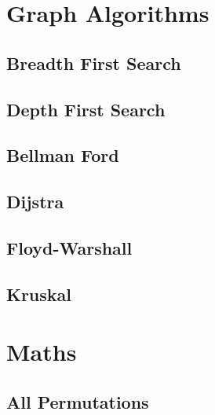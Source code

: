 \documentclass[10pt,a4paper]{article}
\begin{document}
\begin{landscape}
\begin{multicols*}{2}


\section{Graph Algorithms}

\subsection{Breadth First Search}



\subsection{Depth First Search}



\subsection{Bellman Ford}



\subsection{Dijstra}



\subsection{Floyd-Warshall}



\subsection{Kruskal}



\section{Maths}

\subsection{All Permutations}


\end{multicols*}
\end{landscape}
\end{document}
